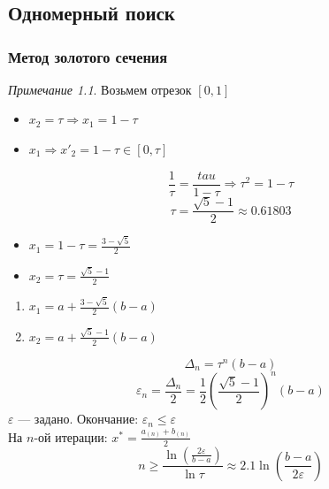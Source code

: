 \documentclass[oneside]{book}
\theoremstyle{plain}
\theoremstyle{remark}
\newtheorem*{remark}{Примечание}
\theoremstyle{definition}
\begin{document}
\chapter{}
\label{sec:org155a7b4}
\section{Одномерный поиск}
\label{sec:org9aa5a50}
\subsection{Метод золотого сечения}
\label{sec:org862a570}
\begin{remark}
Возьмем отрезок \([0, 1]\)
\begin{itemize}
\item \(x_2 = \tau \Rightarrow x_1 = 1 - \tau\)
\item \(x_1 \Rightarrow x'_2 = 1 - \tau \in [0, \tau]\)
\end{itemize}
\[ \frac{1}{\tau} = \frac{tau}{1 - \tau} \Rightarrow \tau^2 = 1 - \tau\]
\[ \tau = \frac{\sqrt{5} - 1}{2} \approx 0.61803 \]
\begin{itemize}
\item \(x_1 = 1 - \tau = \frac{3 - \sqrt{5}}{2}\)
\item \(x_2 = \tau = \frac{\sqrt{5} - 1}{2}\)
\end{itemize}
\end{remark}
\begin{enumerate}
\item \label{x_1_3} \(x_1 = a + \frac{3 - \sqrt{5}}{2}(b - a)\)
\item \label{x_2_3} \(x_2 = a + \frac{\sqrt{5} - 1}{2}(b - a)\)
\end{enumerate}
\[ \Delta_n = \tau^n(b - a) \]
\[ \varepsilon_n = \frac{\Delta_n}{2} = \frac{1}{2}\left(\frac{\sqrt{5} - 1}{2}\right)^n(b - a) \]
\(\varepsilon\) --- задано. Окончание: \(\varepsilon_n \le \varepsilon\) \\
На \(n\text{-ой}\) итерации: \(x^* = \frac{a_{(n)} + b_{(n)}}{2}\) \\
\[ n \ge \frac{\ln\left(\frac{2\varepsilon}{b - a}\right)}{\ln \tau} \approx 2.1 \ln\left(\frac{b - a}{2\varepsilon}\right) \]
\end{document}
